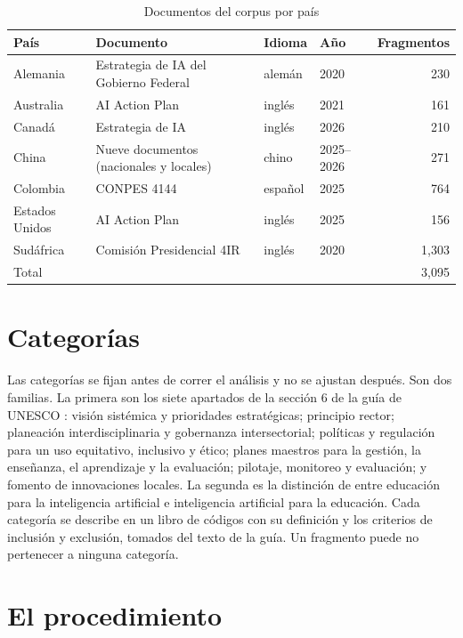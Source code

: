 \begin{table}[htbp]
\centering
\small
\caption{Documentos del corpus por país}
\label{tab:corpus}
\begin{tabular}{llllr}
\hline
País & Documento & Idioma & Año & Fragmentos \\
\hline
Alemania & Estrategia de IA del Gobierno Federal & alemán & 2020 & 230 \\
Australia & AI Action Plan & inglés & 2021 & 161 \\
Canadá & Estrategia de IA & inglés & 2026 & 210 \\
China & Nueve documentos (nacionales y locales) & chino & 2025--2026 & 271 \\
Colombia & CONPES 4144 & español & 2025 & 764 \\
Estados Unidos & AI Action Plan & inglés & 2025 & 156 \\
Sudáfrica & Comisión Presidencial 4IR & inglés & 2020 & 1{,}303 \\
\hline
\multicolumn{4}{l}{Total} & 3{,}095 \\
\hline
\end{tabular}
\end{table}

\section{Categorías}
\label{sec:categorias}

Las categorías se fijan antes de correr el análisis y no se ajustan después. Son dos
familias. La primera son los siete apartados de la sección 6 de la guía de UNESCO
\citep{miao2021guidance}: visión sistémica y prioridades estratégicas; principio rector;
planeación interdisciplinaria y gobernanza intersectorial; políticas y regulación para un
uso equitativo, inclusivo y ético; planes maestros para la gestión, la enseñanza, el
aprendizaje y la evaluación; pilotaje, monitoreo y evaluación; y fomento de innovaciones
locales. La segunda es la distinción de \citet{schiff2022education} entre educación para la
inteligencia artificial e inteligencia artificial para la educación. Cada categoría se
describe en un libro de códigos con su definición y los criterios de inclusión y exclusión,
tomados del texto de la guía. Un fragmento puede no pertenecer a ninguna categoría.

\section{El procedimiento}
\label{sec:procedimiento}

